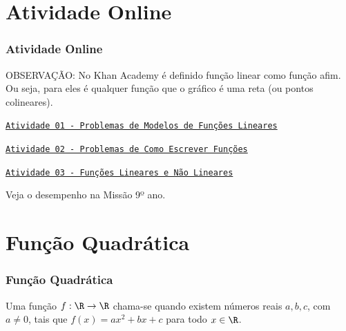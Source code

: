 \documentclass[brazil, notheorems, 10pt]{beamer}
\begin{document}

\section{Atividade Online}
\begin{frame}
\frametitle{Atividade Online} %

OBSERVAÇÃO: No Khan Academy é definido função linear como função
afim. Ou seja, para eles é qualquer função que o gráfico é uma reta
(ou pontos colineares).

\href{https://pt.khanacademy.org/math/cc-eighth-grade-math/cc-8th-linear-equations-functions/8th-linear-functions-modeling/e/constructing-and-interpreting-linear-functions}
{{\tt Atividade 01 - Problemas de Modelos de Funções Lineares}}

\href{https://pt.khanacademy.org/math/cc-eighth-grade-math/cc-8th-linear-equations-functions/constructing-linear-models-real-world/e/constructing-linear-functions-word-problems}
{{\tt Atividade 02 - Problemas de Como Escrever Funções}}

\href{https://pt.khanacademy.org/math/cc-eighth-grade-math/cc-8th-linear-equations-functions/linear-nonlinear-functions-tut/e/linear-non-linear-functions}
{{\tt Atividade 03 - Funções Lineares e Não Lineares}}

Veja o desempenho na Missão 9º ano.


\end{frame}

\section{Função Quadrática}
\begin{frame}
\frametitle{Função Quadrática} %

\begin{Def}
Uma função $f: \R \to \R$ chama-se  quando existem
números reais $a, b, c$, com $a \neq 0$, tais que $f(x) = ax^2 +bx
+c$ para todo $x \in \R$.
\end{Def}


\end{frame}

\end{document}
